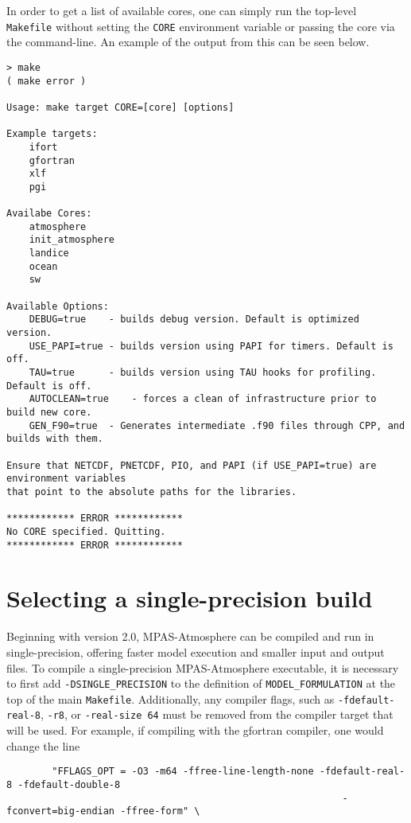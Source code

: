 In order to get a list of available cores, one can simply run the top-level {\tt
Makefile} without setting the {\tt CORE} environment variable or passing the
core via the command-line. An example of the output from this can be seen
below.

{\small
\begin{verbatim}
> make
( make error )

Usage: make target CORE=[core] [options]

Example targets:
    ifort
    gfortran
    xlf
    pgi

Availabe Cores:
    atmosphere
    init_atmosphere
    landice
    ocean
    sw

Available Options:
    DEBUG=true    - builds debug version. Default is optimized version.
    USE_PAPI=true - builds version using PAPI for timers. Default is off.
    TAU=true      - builds version using TAU hooks for profiling. Default is off.
    AUTOCLEAN=true    - forces a clean of infrastructure prior to build new core.
    GEN_F90=true  - Generates intermediate .f90 files through CPP, and builds with them.

Ensure that NETCDF, PNETCDF, PIO, and PAPI (if USE_PAPI=true) are environment variables
that point to the absolute paths for the libraries.

************ ERROR ************
No CORE specified. Quitting.
************ ERROR ************
\end{verbatim}
}

\section{Selecting a single-precision build}

Beginning with version 2.0, MPAS-Atmosphere can be compiled and run in single-precision, offering faster 
model execution and smaller input and output files. To compile a single-precision MPAS-Atmosphere executable, it 
is necessary to first add {\tt -DSINGLE\_PRECISION} to the definition of {\tt MODEL\_FORMULATION} at the top 
of the main {\tt Makefile}. Additionally, any compiler flags, such as {\tt -fdefault-real-8}, {\tt -r8}, or {\tt -real-size 64} must be removed 
from the compiler target that will be used. For example, if compiling with the gfortran compiler, one would change the line

\begin{verbatim}
        "FFLAGS_OPT = -O3 -m64 -ffree-line-length-none -fdefault-real-8 -fdefault-double-8 
                                                           -fconvert=big-endian -ffree-form" \
\end{verbatim}

